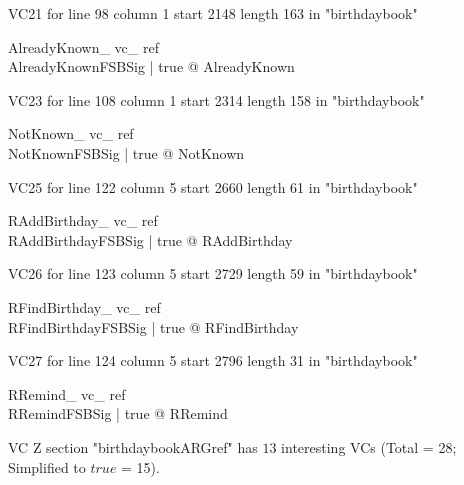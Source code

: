 \documentclass{article}
\begin{document}
VC21 for line 98 column 1 start 2148 length 163 in "birthdaybook"
\begin{theorem}{ AlreadyKnown\_ vc\_ ref}\\
 \forall AlreadyKnownFSBSig | true @ \pre AlreadyKnown \\

\end{theorem}

VC23 for line 108 column 1 start 2314 length 158 in "birthdaybook"
\begin{theorem}{ NotKnown\_ vc\_ ref}\\
 \forall NotKnownFSBSig | true @ \pre NotKnown \\

\end{theorem}

VC25 for line 122 column 5 start 2660 length 61 in "birthdaybook"
\begin{theorem}{ RAddBirthday\_ vc\_ ref}\\
 \forall RAddBirthdayFSBSig | true @ \pre RAddBirthday \\

\end{theorem}

VC26 for line 123 column 5 start 2729 length 59 in "birthdaybook"
\begin{theorem}{ RFindBirthday\_ vc\_ ref}\\
 \forall RFindBirthdayFSBSig | true @ \pre RFindBirthday \\

\end{theorem}

VC27 for line 124 column 5 start 2796 length 31 in "birthdaybook"
\begin{theorem}{ RRemind\_ vc\_ ref}\\
 \forall RRemindFSBSig | true @ \pre RRemind \\

\end{theorem}



 VC Z section "birthdaybookARGref" has $13$ interesting VCs (Total = 28; Simplified to $true$ = 15).



\end{document}
